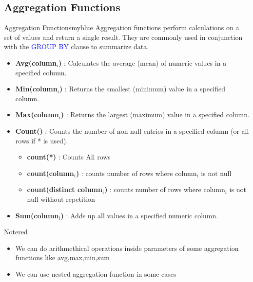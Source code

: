 \subsection{Aggregation Functions}
 \begin{prettyBox}{Aggregation Functions}{myblue}
   Aggregation functions perform calculations on a set of values and return a single result. They are commonly used in conjunction with the \textcolor{blue}{GROUP BY} clause to summarize data.
   \begin{itemize}
    \item \textbf{Avg(column$_{i}$)} : Calculates the average (mean) of numeric values in a specified column.
    \item \textbf{Min(column$_{i}$)} : Returns the smallest (minimum) value in a specified column.
    \item \textbf{Max(column$_{i}$)} : Returns the largest (maximum) value in a specified column.
    \item \textbf{Count()} : Counts the number of non-null entries in a specified column (or all rows if * is used).
      \begin{itemize}
        \item  \textbf{count(*)} : Counts All rows
        \item  \textbf{count(column$_{i}$)} : counts number of rows where column$_{i}$ is not null
        \item  \textbf{count(distinct column$_{i}$)} : counts number of rows where column$_{i}$ is not null without repetition
    \end{itemize}
    \item \textbf{Sum(column$_{i}$)} : Adds up all values in a specified numeric column.
   \end{itemize} 
\end{prettyBox}

\vspace{0.25cm}

\begin{prettyBox}{Note}{red}
\begin{itemize}
    \item We can do arithmethical operations inside parameters of some aggregation functions like avg,max,min,sum 
    \item We can use nested aggregation function in some cases 
\end{itemize}
\end{prettyBox}

\vspace{0.5cm}
